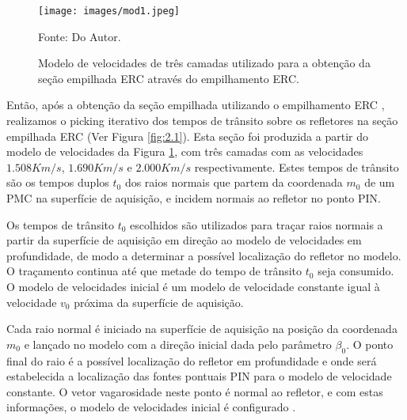 \begin{figure}[H]
\caption{Modelo de velocidades de três camadas utilizado para a obtenção da seção
empilhada ERC através do empilhamento ERC.}
\begin{center}
\texttt{[image: images/mod1.jpeg]}
\vspace{-0.3cm}
\end{center}
\begin{center}
 Fonte: Do Autor.
\end{center}
\label{fig:2.2}
\end{figure}


Então, após a obtenção da seção empilhada utilizando o empilhamento ERC \cite{relatorio}, realizamos
o picking iterativo dos tempos de trânsito sobre os refletores na seção empilhada ERC (Ver Figura \ref{fig:2.1}). Esta seção foi produzida a partir do modelo de velocidades da Figura \ref{fig:2.2},
com três camadas com as velocidades $1.508Km/s$, $1.690Km/s$ e $2.000Km/s$ respectivamente.
Estes tempos de trânsito são os tempos duplos $t_0$ dos raios normais que partem da coordenada $m_0$
de um PMC na superfície de aquisição, e incidem normais ao refletor no ponto PIN.

Os tempos de trânsito $t_0$ escolhidos são utilizados para traçar raios normais
a partir da superfície de aquisição em direção ao modelo de velocidades
em profundidade,
de modo a determinar a possível localização do refletor no modelo.
O traçamento continua até que metade do tempo de trânsito $t_0$ seja consumido.
O modelo de velocidades inicial é um modelo de velocidade constante igual à velocidade $v_0$
próxima da superfície de aquisição.

Cada raio normal é iniciado na superfície de aquisição na posição da coordenada $m_0$ e lançado no modelo 
com a direção inicial dada pelo parâmetro $\beta_0$.
O ponto final do raio é a possível localização do refletor em profundidade
e onde será estabelecida a localização das fontes pontuais PIN para o modelo de velocidade
constante. O vetor vagarosidade neste ponto é
normal ao refletor, e com estas informações, o modelo de velocidades inicial é configurado \cite{niptomo}.

